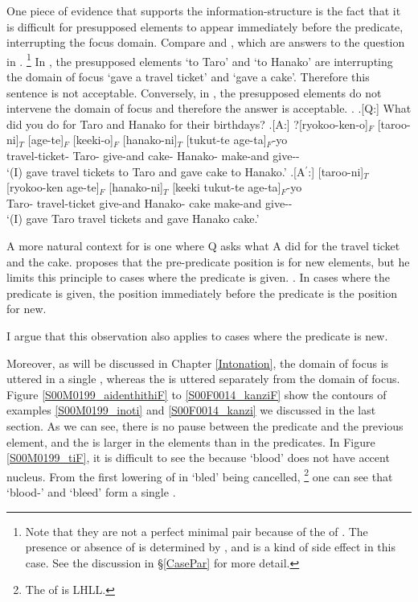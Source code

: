 One piece of evidence that supports the information-structure  is the fact that
it is difficult for presupposed elements to appear immediately before the predicate,
interrupting the focus domain.
Compare \Next[A] and \Next[A$^{\prime}$],
which are answers to the question in \Next[Q].%
	\footnote{
	Note that they are not a perfect minimal pair because of the  of .
	The presence or absence of  is determined by , and
	 is a kind of side effect in this case.
	See the discussion in \S \ref{CasePar} for more detail.
	}
In \Next[A],
the presupposed elements  `to Taro' and  `to Hanako' are interrupting the domain of focus `gave a travel ticket' and `gave a cake'.
Therefore this sentence is not acceptable.
Conversely, in \Next[A$^{\prime}$],
the presupposed elements do not intervene the domain of focus and therefore the answer is acceptable.
%
\ex.
 \a.[Q:] What did you do for Taro and Hanako for their birthdays?
 \bg.[A:] ?[ryokoo-ken-o]$_{F}$ [taroo-ni]$_{T}$ [age-te]$_{F}$ [keeki-o]$_{F}$ [hanako-ni]$_{T}$ [tukut-te age-ta]$_{F}$-yo \\
 			travel-ticket- Taro- give-and cake- Hanako- make-and give-- \\
			`(I) gave travel tickets to Taro and gave cake to Hanako.'
 \bg.[A$^{\prime}$:] [taroo-ni]$_{T}$ [ryokoo-ken age-te]$_{F}$ [hanako-ni]$_{T}$ [keeki tukut-te age-ta]$_{F}$-yo \\
 			Taro- travel-ticket give-and Hanako- cake make-and give-- \\
			`(I) gave Taro travel tickets and gave Hanako cake.'

A more natural context for \Last[A] is one where Q asks
what A did for the travel ticket and the cake.
 proposes that
the pre-predicate position is for new elements,
but he limits this principle to cases
where the predicate is given.
%
\ex.
 In cases where the predicate is given,
 the position immediately before the predicate is the position for new.
 \hfill{\cite[][60, translated by the current author]{kuno78}}

I argue that this observation also applies to cases where the predicate is new.

Moreover,
as will be discussed in Chapter \ref{Intonation},
the domain of focus is uttered in a single ,
whereas the  is uttered separately from the domain of focus.
Figure \ref{S00M0199_aidenthithiF} to \ref{S00F0014_kanziF} show
the  contours of examples \ref{S00M0199_inoti} and \ref{S00F0014_kanzi} we discussed in the last section.
As we can see,
there is no pause between the predicate and the previous element, and
the  is larger in the elements than in the predicates.
In Figure \ref{S00M0199_tiF},
it is difficult to see the  because  `blood' does not have accent nucleus.
From the first lowering of  in  `bled' being cancelled,%
	\footnote{
	The  of  is LHLL.
	}
one can see that
 `blood-' and  `bleed' form a single .


